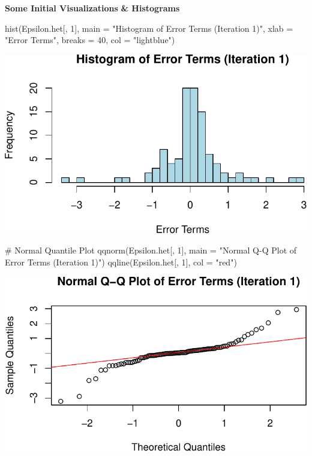 \documentclass[
  11pt,
]{article}
\newenvironment{Shaded}{\begin{snugshade}}{\end{snugshade}}
\newcommand{\AttributeTok}[1]{\textcolor[rgb]{0.40,0.45,0.13}{#1}}
\newcommand{\CommentTok}[1]{\textcolor[rgb]{0.37,0.37,0.37}{#1}}
\newcommand{\DecValTok}[1]{\textcolor[rgb]{0.68,0.00,0.00}{#1}}
\newcommand{\FunctionTok}[1]{\textcolor[rgb]{0.28,0.35,0.67}{#1}}
\newcommand{\NormalTok}[1]{\textcolor[rgb]{0.00,0.23,0.31}{#1}}
\newcommand{\StringTok}[1]{\textcolor[rgb]{0.13,0.47,0.30}{#1}}
\begin{document}
\textbf{Some Initial Visualizations} \textbf{\& Histograms}

\begin{Shaded}
\begin{Highlighting}[]
\FunctionTok{hist}\NormalTok{(Epsilon.het[, }\DecValTok{1}\NormalTok{], }\AttributeTok{main =} \StringTok{"Histogram of Error Terms (Iteration 1)"}\NormalTok{, }
     \AttributeTok{xlab =} \StringTok{"Error Terms"}\NormalTok{, }\AttributeTok{breaks =} \DecValTok{40}\NormalTok{, }\AttributeTok{col =} \StringTok{"lightblue"}\NormalTok{)}
\end{Highlighting}
\end{Shaded}

\includegraphics{HW-4-CODE-and-ANSWERS_files/figure-pdf/unnamed-chunk-17-1.pdf}

\begin{Shaded}
\begin{Highlighting}[]
\CommentTok{\# Normal Quantile Plot}
\FunctionTok{qqnorm}\NormalTok{(Epsilon.het[, }\DecValTok{1}\NormalTok{], }\AttributeTok{main =} \StringTok{"Normal Q{-}Q Plot of Error Terms (Iteration 1)"}\NormalTok{)}
\FunctionTok{qqline}\NormalTok{(Epsilon.het[, }\DecValTok{1}\NormalTok{], }\AttributeTok{col =} \StringTok{"red"}\NormalTok{)}
\end{Highlighting}
\end{Shaded}

\includegraphics{HW-4-CODE-and-ANSWERS_files/figure-pdf/unnamed-chunk-17-2.pdf}
\end{document}

